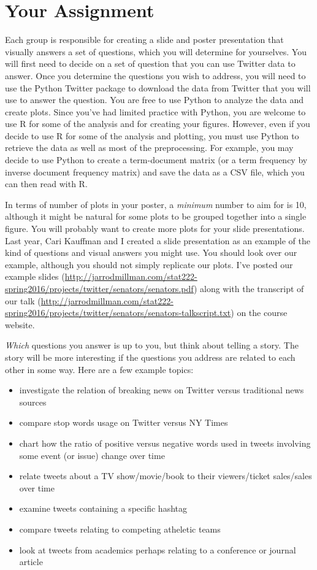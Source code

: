 \documentclass[11pt, oneside]{article}   	%
\begin{document}
\section{Your Assignment}

Each group is responsible for creating a slide and poster presentation that
visually answers a set of questions, which you will determine for yourselves.
You will first need to decide on a set of question that you can use Twitter
data to answer.  Once you determine the questions you wish to address, you will
need to use the Python Twitter package to download the data from Twitter that
you will use to answer the question.  You are free to use Python to analyze the
data and create plots.  Since you've had limited practice with Python, you are
welcome to use R for some of the analysis and for creating your figures.
However, even if you decide to use R for some of the analysis and plotting, you
must use Python to retrieve the data as well as most of the preprocessing.  For
example, you may decide to use Python to create a term-document matrix (or a
term frequency by inverse document frequency matrix) and save the data as a CSV
file, which you can then read with R.

In terms of number of plots in your poster, a {\em minimum} number to aim for
is 10, although it might be natural for some plots to be grouped together into
a single figure.  You will probably want to create more plots for your slide
presentations.  Last year, Cari Kauffman and I created a slide presentation as
an example of the kind of questions and visual answers you might use.  You
should look over our example, although you should not simply replicate our
plots.  I've posted our example slides
(\url{http://jarrodmillman.com/stat222-spring2016/projects/twitter/senators/senators.pdf}) along
with the transcript of our talk
(\url{http://jarrodmillman.com/stat222-spring2016/projects/twitter/senators/senators-talkscript.txt})
on the course website.

{\em Which} questions you answer is up to you, but think about telling a story.
The story will be more interesting if the questions you address are related to
each other in some way.  Here are a few example topics:

\begin{itemize}
\item investigate the relation of breaking news on Twitter versus traditional
      news sources
\item compare stop words usage on Twitter versus NY Times
\item chart how the ratio of positive versus negative words used in tweets
      involving some event (or issue) change over time
\item relate tweets about a TV show/movie/book to their viewers/ticket
      sales/sales over time
\item examine tweets containing a specific hashtag
\item compare tweets relating to competing atheletic teams
\item look at tweets from academics perhaps relating to a conference
      or journal article
\end{itemize}
\end{document}
